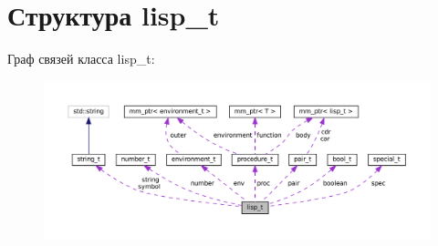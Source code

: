 \hypertarget{structlisp__t}{}\section{Структура lisp\+\_\+t}
\label{structlisp__t}


Граф связей класса lisp\+\_\+t\+:
\nopagebreak
\begin{figure}[H]
\begin{center}
\leavevmode
\includegraphics[width=350pt]{structlisp__t__coll__graph}
\end{center}
\end{figure}
